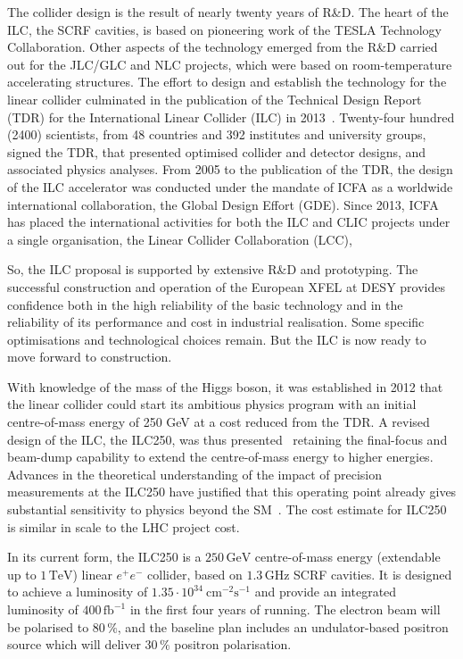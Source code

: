 The collider design is the result of nearly twenty years of
R\&D. The heart of the ILC, the SCRF cavities, is based on
pioneering work of the TESLA Technology Collaboration. Other aspects of the 
technology
emerged from the R\&D carried out for the JLC/GLC and NLC projects,
which were based on room-temperature accelerating structures. 
The effort to design and
establish the technology for the linear collider culminated in the
publication of the Technical Design Report (TDR) for the International
Linear Collider (ILC) in 2013~\cite{Behnke:2013xla}. 
Twenty-four hundred (2400) scientists, from 48 countries and 392 institutes and university
groups,
 signed the TDR,
 that presented optimised collider and detector designs, and associated 
physics analyses. 
From
2005 to the publication of the TDR, the
design of the ILC accelerator was conducted under the mandate of ICFA
as a worldwide
international collaboration, the Global Design Effort (GDE). 
Since 2013, ICFA has placed the  international activities for both the ILC and CLIC
projects under a single organisation, 
the Linear Collider Collaboration (LCC),

So, the ILC proposal
is supported by extensive R\&D and prototyping. The successful construction and
operation 
of the European XFEL at DESY provides
confidence both in the high reliability of the basic
technology and in the reliability of its performance and cost in 
industrial realisation.   
Some specific optimisations and technological choices remain.
But the ILC is now ready to move forward to construction. 


With knowledge of the mass of the Higgs boson, it was established in 2012 that the
linear collider could start its ambitious physics program with an initial centre-of-mass energy of 250 GeV at a cost
reduced from the TDR. A revised design of the ILC, the ILC250, was
thus  presented~\cite{Evans:2017rvt} retaining the final-focus and
beam-dump capability to extend the centre-of-mass energy to higher
energies. Advances in the theoretical understanding of the impact of precision
measurements at the 
 ILC250 have justified that this operating point already gives
 substantial 
sensitivity to physics beyond the SM~\cite{Barklow:2017suo,Fujii:2017vwa}. 
 The cost estimate for ILC250 
  is similar in scale to the LHC project cost.


In its current
form, the ILC250 is a $250\,{\mathrm{GeV}}$ centre-of-mass energy
(extendable up to $1\,{\mathrm{TeV}}$) linear $e^+e^-$ collider, based
on $1.3\,{\mathrm{GHz}}$ SCRF
cavities. It is designed to achieve a luminosity of $1.35\cdot
10^{34}~{\mathrm{cm}}^{-2}{\mathrm{s}}^{-1}$ and provide an integrated
luminosity of $400\,{\mathrm{fb}}^{-1}$ in the first four years of
running. The electron beam will be polarised to $80\,\%$, and the baseline plan includes an 
undulator-based
positron source which will  deliver
$30\,\%$ positron  polarisation. 


